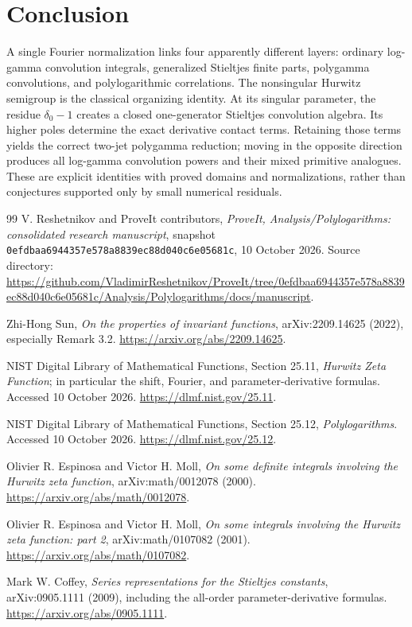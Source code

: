 \documentclass[11pt]{article}
\numberwithin{equation}{section}
\theoremstyle{definition}
\theoremstyle{remark}
\newcommand{\pin}{\texttt{0efdbaa6944357e578a8839ec88d040c6e05681c}}
\begin{document}
\section{Conclusion}
A single Fourier normalization links four apparently different layers:
ordinary log-gamma convolution integrals, generalized Stieltjes finite
parts, polygamma convolutions, and polylogarithmic correlations. The
nonsingular Hurwitz semigroup is the classical organizing identity.
At its singular parameter, the residue $\delta_0-1$ creates a closed
one-generator Stieltjes convolution algebra. Its higher poles determine
the exact derivative contact terms. Retaining those terms yields the
correct two-jet polygamma reduction; moving in the opposite direction
produces all log-gamma convolution powers and their mixed primitive
analogues. These are explicit identities with proved domains and
normalizations, rather than conjectures supported only by small
numerical residuals.

\clearpage
\begin{thebibliography}{99}
V. Reshetnikov and ProveIt contributors,
\emph{ProveIt, Analysis/Polylogarithms: consolidated research manuscript},
snapshot \pin, 10 October 2026. Source directory:
\url{https://github.com/VladimirReshetnikov/ProveIt/tree/0efdbaa6944357e578a8839ec88d040c6e05681c/Analysis/Polylogarithms/docs/manuscript}.

Zhi-Hong Sun, \emph{On the properties of invariant functions},
arXiv:2209.14625 (2022), especially Remark 3.2.
\url{https://arxiv.org/abs/2209.14625}.

NIST Digital Library of Mathematical Functions,
Section 25.11, \emph{Hurwitz Zeta Function}; in particular the shift,
Fourier, and parameter-derivative formulas. Accessed 10 October 2026.
\url{https://dlmf.nist.gov/25.11}.

NIST Digital Library of Mathematical Functions,
Section 25.12, \emph{Polylogarithms}. Accessed 10 October 2026.
\url{https://dlmf.nist.gov/25.12}.

Olivier R. Espinosa and Victor H. Moll,
\emph{On some definite integrals involving the Hurwitz zeta function},
arXiv:math/0012078 (2000).
\url{https://arxiv.org/abs/math/0012078}.

Olivier R. Espinosa and Victor H. Moll,
\emph{On some integrals involving the Hurwitz zeta function: part 2},
arXiv:math/0107082 (2001).
\url{https://arxiv.org/abs/math/0107082}.

Mark W. Coffey, \emph{Series representations for the Stieltjes constants},
arXiv:0905.1111 (2009), including the all-order parameter-derivative
formulas. \url{https://arxiv.org/abs/0905.1111}.
\end{thebibliography}
\end{document}
